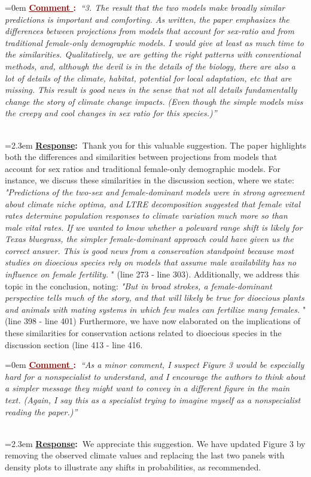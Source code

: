 \documentclass[12pt]{article}
\newcounter{cN}
\newcommand{\comment}[1]{
	\vspace{2em}
	\refstepcounter{cN} %
	\noindent \hangindent=0em \textbf{\textcolor{Maroon}{\uline{Comment \thecN}:~}}\emph{``#1''}
	}
\newcommand{\response}[1]{
	\\[0.25em]
	\hangindent=2.3em \textbf{\textcolor{NavyBlue}{\uline{Response}:~}}#1
	}
\begin{document}
\comment{3. The result that the two models make broadly similar predictions is important and comforting. As written, the paper emphasizes the differences between projections from models that account for sex-ratio and from traditional female-only demographic models. I would give at least as much time to the similarities. Qualitatively, we are getting the right patterns with conventional methods, and, although the devil is in the details of the biology, there are also a lot of details of the climate, habitat, potential for local adaptation, etc that are missing. This result is good news in the sense that not all details fundamentally change the story of climate change impacts. (Even though the simple models miss the creepy and cool changes in sex ratio for this species.)}
\response{Thank you for this valuable suggestion.
 The paper highlights both the differences and similarities between projections from models that account for sex ratios and traditional female-only demographic models. 
 For instance, we discuss these similarities in the discussion section, where we state: \emph{"Predictions of the two-sex and female-dominant models were in strong agreement about climate niche optima, and LTRE decomposition suggested that female vital rates determine population responses to climate variation much more so than male vital rates. 
If we wanted to know whether a poleward range shift is likely for Texas bluegrass, the simpler female-dominant approach could have given us the correct answer. 
This is good news from a conservation standpoint because most studies on dioecious species rely on models that assume male availability has no influence on female fertility.
} " (line 273 - line 303). 
 Additionally, we address this topic in the conclusion, noting:\emph{ "But in broad strokes, a female-dominant perspective tells much of the story, and that will likely be true for dioecious plants and animals with mating systems in which few males can fertilize many females.} " (line 398 - line 401)
Furthermore, we have now elaborated on the implications of these similarities for conservation actions related to dioecious species in the discussion section (line 413 - line 416.}

\comment{As a minor comment, I suspect Figure 3 would be especially hard for a nonspecialist to understand, and I encourage the authors to think about a simpler message they might want to convey in a different figure in the main text. (Again, I say this as a specialist trying to imagine myself as a nonspecialist reading the paper.)}
\response{We appreciate this suggestion. 
We have updated Figure 3 by removing the observed climate values and replacing the last two panels with density plots to illustrate any shifts in probabilities, as  recommended.}


\end{document}
